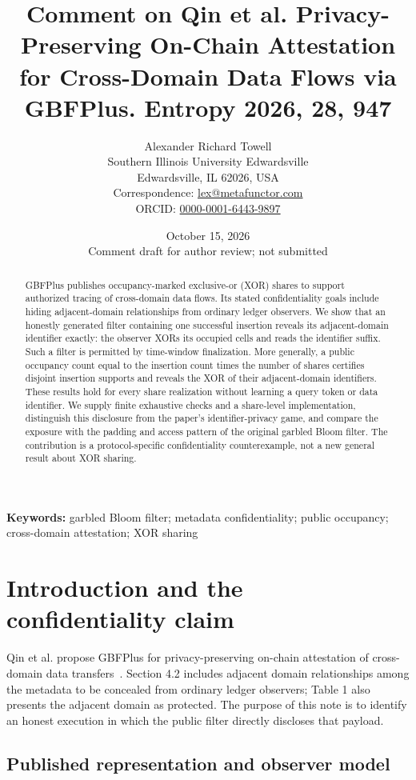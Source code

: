 \documentclass[11pt]{article}
\title{\Large Comment on Qin et al. Privacy-Preserving On-Chain Attestation
for Cross-Domain Data Flows via GBFPlus. Entropy 2026, 28, 947}
\author{Alexander Richard Towell\\
\small Southern Illinois University Edwardsville\\
\small Edwardsville, IL 62026, USA\\
\small Correspondence: \href{mailto:lex@metafunctor.com}{lex@metafunctor.com}\\
\small ORCID: \href{https://orcid.org/0000-0001-6443-9897}{0000-0001-6443-9897}}
\date{October 15, 2026\\\small Comment draft for author review; not submitted}
\begin{document}
\maketitle
\begin{abstract}
GBFPlus publishes occupancy-marked exclusive-or (XOR) shares to support authorized tracing
of cross-domain data flows. Its stated confidentiality goals include hiding
adjacent-domain relationships from ordinary ledger observers. We show that an
honestly generated filter containing one successful insertion reveals its
adjacent-domain identifier exactly: the observer XORs its occupied cells and
reads the identifier suffix. Such a filter is permitted by time-window
finalization. More generally, a public occupancy count equal to the insertion
count times the number of shares certifies disjoint insertion supports and
reveals the XOR of their adjacent-domain identifiers. These results hold for
every share realization without learning a query token or data identifier.
We supply finite exhaustive checks and a share-level implementation, distinguish
this disclosure from the paper's identifier-privacy game, and compare the
exposure with the padding and access pattern of the original garbled Bloom
filter. The contribution is a protocol-specific confidentiality counterexample,
not a new general result about XOR sharing.
\end{abstract}

\noindent\textbf{Keywords:} garbled Bloom filter; metadata confidentiality;
public occupancy; cross-domain attestation; XOR sharing

\section{Introduction and the confidentiality claim}

Qin et al. propose GBFPlus for privacy-preserving on-chain attestation of
cross-domain data transfers~\cite{qin2026gbfplus}. Section 4.2 includes adjacent
domain relationships among the metadata to be concealed from ordinary ledger
observers; Table 1 also presents the adjacent domain as protected. The purpose
of this note is to identify an honest execution in which the public filter
directly discloses that payload.

\subsection{Published representation and observer model}
\end{document}
